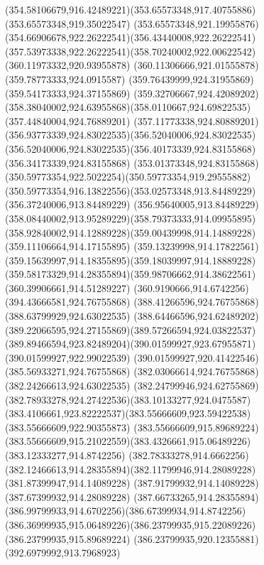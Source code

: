 {{{{				\curveto(354.58106679,916.42489221)(353.65573348,917.40755886)(353.65573348,919.35022547)
				\curveto(353.65573348,921.19955876)(354.66906678,922.26222541)(356.43440008,922.26222541)
				\curveto(357.53973338,922.26222541)(358.70240002,922.00622542)(360.11973332,920.93955878)
				\lineto(360.11306666,921.01555878)
				\lineto(359.78773333,924.0915587)
				\lineto(359.76439999,924.31955869)
				\lineto(359.54173333,924.37155869)
				\lineto(359.32706667,924.42089202)
				\curveto(358.38040002,924.63955868)(358.0110667,924.69822535)(357.44840004,924.76889201)
				\curveto(357.11773338,924.80889201)(356.93773339,924.83022535)(356.52040006,924.83022535)
				\curveto(356.52040006,924.83022535)(356.40173339,924.83155868)(356.34173339,924.83155868)
				\curveto(353.01373348,924.83155868)(350.59773354,922.5022254)(350.59773354,919.29555882)
				\curveto(350.59773354,916.13822556)(353.02573348,913.84489229)(356.37240006,913.84489229)
				\curveto(356.95640005,913.84489229)(358.08440002,913.95289229)(358.79373333,914.09955895)
				\curveto(358.92840002,914.12889228)(359.00439998,914.14889228)(359.11106664,914.17155895)
				\curveto(359.13239998,914.17822561)(359.15639997,914.18355895)(359.18039997,914.18889228)
				\curveto(359.58173329,914.28355894)(359.98706662,914.38622561)(360.39906661,914.51289227)
				\lineto(360.9190666,914.6742256)
				\closepath
				\moveto(394.43666581,924.76755868)
				\lineto(388.41266596,924.76755868)
				\lineto(388.63799929,924.63022535)
				\curveto(388.64466596,924.62489202)(389.22066595,924.27155869)(389.57266594,924.03822537)
				\curveto(389.89466594,923.82489204)(390.01599927,923.67955871)(390.01599927,922.99022539)
				\lineto(390.01599927,920.41422546)
				\lineto(385.56933271,924.76755868)
				\lineto(382.03066614,924.76755868)
				\lineto(382.24266613,924.63022535)
				\curveto(382.24799946,924.62755869)(382.78933278,924.27422536)(383.10133277,924.0475587)
				\curveto(383.4106661,923.82222537)(383.55666609,923.59422538)(383.55666609,922.90355873)
				\lineto(383.55666609,915.89689224)
				\curveto(383.55666609,915.21022559)(383.4326661,915.06489226)(383.12333277,914.8742256)
				\curveto(382.78333278,914.6662256)(382.12466613,914.28355894)(382.11799946,914.28089228)
				\lineto(381.87399947,914.14089228)
				\lineto(387.91799932,914.14089228)
				\lineto(387.67399932,914.28089228)
				\curveto(387.66733265,914.28355894)(386.99799933,914.6702256)(386.67399934,914.8742256)
				\curveto(386.36999935,915.06489226)(386.23799935,915.22089226)(386.23799935,915.89689224)
				\lineto(386.23799935,920.12355881)
				\lineto(392.6979992,913.7968923)
}}}}
